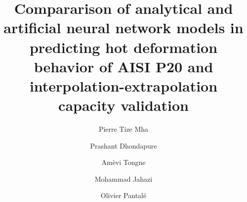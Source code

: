 \documentclass[twoside,english,1p,final,sort&compress]{elsarticle}
\theoremstyle{plain}
\begin{document}
\begin{frontmatter}

\title{Compararison of analytical and artificial neural network models in predicting hot deformation behavior of AISI P20 and  interpolation-extrapolation capacity validation}

\author[LGP]{Pierre Tize Mha}
\author[ETS]{Prashant Dhondapure}
\author[LGP]{Amèvi Tongne}
\author[ETS]{Mohammad Jahazi}
\author[LGP]{Olivier Pantalé }


\address[LGP]{Laboratoire Génie de Production, INP/ENIT, Université de Toulouse, 47 Av d'Azereix, Tarbes, France 65016}
\address[ETS]{École de Technologie Supérieure, 1100 Rue Notre Dame O, Montréal, QC H3C 1K3}


\end{frontmatter}
\end{document}
